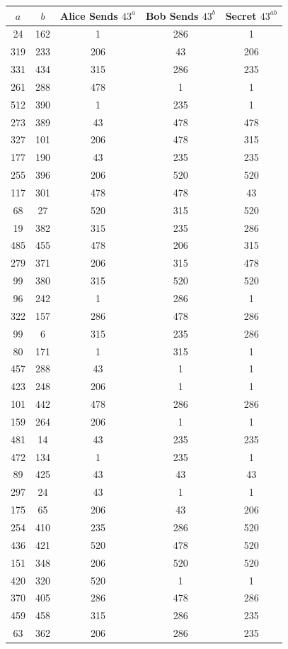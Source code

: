 \documentclass[12pt]{article}
\begin{document}
\begin{enumerate}
\begin{enumerate}
\begin{tabular}{|c|c|c|c|c|}
\hline
$a$ & $b$ & Alice Sends $43^a$ & Bob Sends $43^b$ & Secret $43^{ab}$ \\
\hline
24 & 162 & 1 & 286 & 1 \\
319 & 233 & 206 & 43 & 206 \\
331 & 434 & 315 & 286 & 235 \\
261 & 288 & 478 & 1 & 1 \\
512 & 390 & 1 & 235 & 1 \\
273 & 389 & 43 & 478 & 478 \\
327 & 101 & 206 & 478 & 315 \\
177 & 190 & 43 & 235 & 235 \\
255 & 396 & 206 & 520 & 520 \\
117 & 301 & 478 & 478 & 43 \\
68 & 27 & 520 & 315 & 520 \\
19 & 382 & 315 & 235 & 286 \\
485 & 455 & 478 & 206 & 315 \\
279 & 371 & 206 & 315 & 478 \\
99 & 380 & 315 & 520 & 520 \\
96 & 242 & 1 & 286 & 1 \\
322 & 157 & 286 & 478 & 286 \\
99 & 6 & 315 & 235 & 286 \\
80 & 171 & 1 & 315 & 1 \\
457 & 288 & 43 & 1 & 1 \\
423 & 248 & 206 & 1 & 1 \\
101 & 442 & 478 & 286 & 286 \\
159 & 264 & 206 & 1 & 1 \\
481 & 14 & 43 & 235 & 235 \\
472 & 134 & 1 & 235 & 1 \\
89 & 425 & 43 & 43 & 43 \\
297 & 24 & 43 & 1 & 1 \\
175 & 65 & 206 & 43 & 206 \\
254 & 410 & 235 & 286 & 520 \\
436 & 421 & 520 & 478 & 520 \\
151 & 348 & 206 & 520 & 520 \\
420 & 320 & 520 & 1 & 1 \\
370 & 405 & 286 & 478 & 286 \\
459 & 458 & 315 & 286 & 235 \\
63 & 362 & 206 & 286 & 235 \\

\end{tabular}
\end{enumerate}
\end{enumerate}
\end{document}
